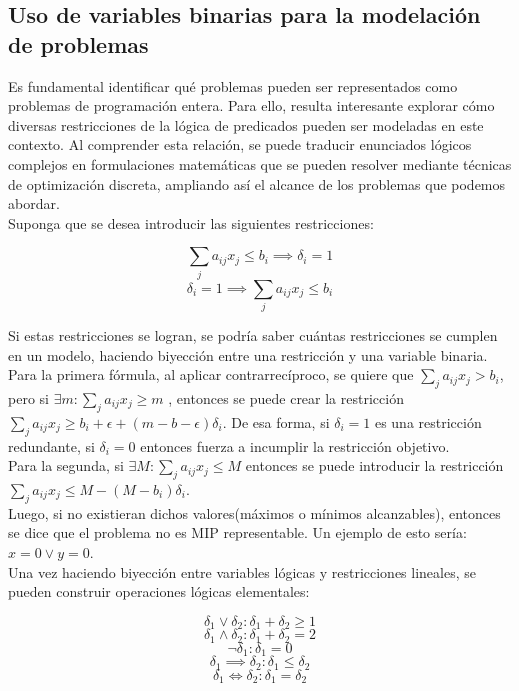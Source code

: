 \documentclass[12pt]{report}
\begin{document}
\subsection{Uso de variables binarias para la modelación de problemas}


Es fundamental identificar qué problemas pueden ser representados como problemas de programación entera. Para ello, resulta interesante explorar cómo diversas restricciones de la lógica de predicados pueden ser modeladas en este contexto. Al comprender esta relación, se puede traducir enunciados lógicos complejos en formulaciones matemáticas que se pueden resolver mediante técnicas de optimización discreta, ampliando así el alcance de los problemas que podemos abordar.\\

Suponga que se desea introducir las siguientes restricciones:

$$ \sum_j a_{ij}x_j \leq  b_i \implies  \delta_i = 1$$
$$  \delta_i = 1 \implies  \sum_j a_{ij}x_j \leq  b_i$$

Si estas restricciones se logran, se podría saber cuántas restricciones se cumplen en un modelo, haciendo biyección entre una restricción y una variable binaria.\\

Para la primera fórmula, al aplicar contrarrecíproco, se quiere que $\sum_j a_{ij}x_j > b_i$, pero si $\exists m:\sum_j a_{ij}x_j\geq  m$ , entonces se puede crear la restricción $\sum_j a_{ij}x_j \geq  b_i+\epsilon+(m-b-\epsilon)\delta_i$. De esa forma, si $\delta_i=1$ es una restricción redundante, si $\delta_i=0$ entonces fuerza a incumplir la restricción objetivo.\\

Para la segunda, si $\exists M:\sum_j a_{ij}x_j\leq  M$ entonces se puede introducir la restricción $\sum_j a_{ij}x_j \leq  M-(M-b_i)\delta_i$. \\

Luego, si no existieran dichos valores(máximos o mínimos alcanzables), entonces se dice que el problema no es MIP representable. Un ejemplo de esto sería: $x=0\lor  y=0$.\\

Una vez haciendo biyección entre variables lógicas y restricciones lineales, se pueden construir operaciones lógicas elementales:

$$\delta_1 \lor  \delta_2:\delta_1+\delta_2\geq 1$$
$$\delta_1 \land \delta_2:\delta_1+\delta_2=2$$
$$\neg\delta_1 :\delta_1=0$$
$$\delta_1 \implies  \delta_2:\delta_1\leq  \delta_2$$
$$\delta_1 \iff \delta_2:\delta_1=\delta_2$$
\end{document}
